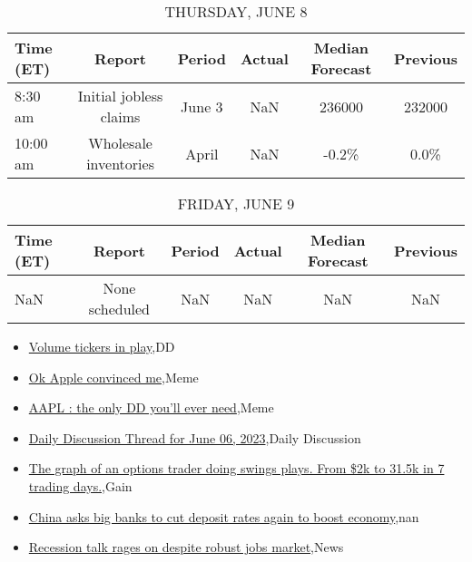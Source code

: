 \documentclass{article}%
\begin{document}
%


\begin{table}[htbp]%
\caption{THURSDAY, JUNE 8}%
\centering%
\begin{adjustbox}{width=1\textwidth}%
\begin{tabular}{lccccc}
\toprule
Time (ET) &                 Report & Period & Actual & Median Forecast & Previous \\
\midrule
  8:30 am & Initial jobless claims & June 3 &    NaN &          236000 &   232000 \\
 10:00 am &  Wholesale inventories &  April &    NaN &           -0.2\% &     0.0\% \\
\bottomrule
\end{tabular}
%
\end{adjustbox}%
\end{table}

%


\begin{table}[htbp]%
\caption{FRIDAY, JUNE 9}%
\centering%
\begin{adjustbox}{width=1\textwidth}%
\begin{tabular}{lccccc}
\toprule
Time (ET) &         Report & Period & Actual & Median Forecast & Previous \\
\midrule
      NaN & None scheduled &    NaN &    NaN &             NaN &      NaN \\
\bottomrule
\end{tabular}
%
\end{adjustbox}%
\end{table}

%
\begin{itemize}%
\item%
\href{https://reddit.com/r/wallstreetbets/comments/142dyjt/volume\_tickers\_in\_play/}{Volume tickers in play},DD%
\item%
\href{https://reddit.com/r/wallstreetbets/comments/142ch3x/ok\_apple\_convinced\_me/}{Ok Apple convinced me},Meme%
\item%
\href{https://reddit.com/r/wallstreetbets/comments/142b64n/aapl\_the\_only\_dd\_youll\_ever\_need/}{AAPL : the only DD you'll ever need},Meme%
\item%
\href{https://reddit.com/r/wallstreetbets/comments/142avm0/daily\_discussion\_thread\_for\_june\_06\_2023/}{Daily Discussion Thread for June 06, 2023},Daily Discussion%
\item%
\href{https://reddit.com/r/wallstreetbets/comments/142atis/the\_graph\_of\_an\_options\_trader\_doing\_swings\_plays/}{The graph of an options trader doing swings plays. From \$2k to 31.5k in 7 trading days.},Gain%
\item%
\href{https://reddit.com/r/Economics/comments/14287ye/china\_asks\_big\_banks\_to\_cut\_deposit\_rates\_again/}{China asks big banks to cut deposit rates again to boost economy},nan%
\item%
\href{https://reddit.com/r/Economics/comments/1425ont/recession\_talk\_rages\_on\_despite\_robust\_jobs\_market/}{Recession talk rages on despite robust jobs market},News%
\end{itemize}%
\end{document}
